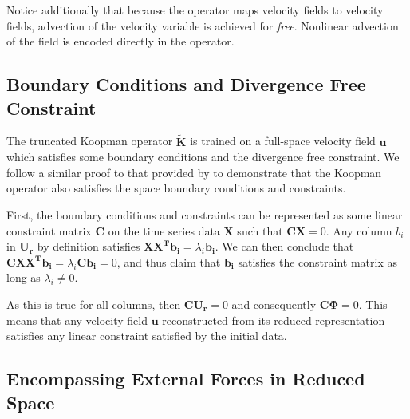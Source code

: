 Notice additionally that because the operator maps velocity fields to velocity fields, advection of the velocity variable is achieved for \emph{free}. Nonlinear advection of the field is encoded directly in the operator.

\subsection{Boundary Conditions and Divergence Free Constraint}
The truncated Koopman operator $\tilde{\bm{K}}$ is trained on a full-space velocity field $\bm{u}$ which satisfies some boundary conditions and the divergence free constraint. We follow a similar proof to that provided by \citet{treuille2006model} to demonstrate that the Koopman operator also satisfies the space boundary conditions and constraints. 

First, the boundary conditions and constraints can be represented as some linear constraint matrix $\bm C$ on the time series data $\bm X$ such that $\bm{C} \bm{X} = 0$.
Any column $b_i$ in $\bm{U_r}$ by definition satisfies $\bm{X}\bm{X^T}\bm{b_i} = \lambda_i \bm{b_i}$. We can then conclude that $\bm{C}\bm{X}\bm{X^T}\bm{b_i} = \lambda_i\bm{C}\bm{b_i} = 0$, and thus claim that $\bm{b_i}$ satisfies the constraint matrix as long as $\lambda_i \ne 0$.

As this is true for all columns, then $\bm{C}\bm{U_r} = 0$ and consequently $\bm{C}\bm{\Phi} = 0$. This means that any velocity field $\bm u$ reconstructed from its reduced representation satisfies any linear constraint satisfied by the initial data. 

\subsection{Encompassing External Forces in Reduced Space}

